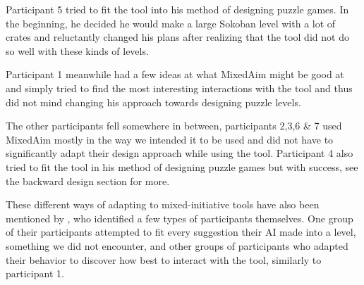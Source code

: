 Participant 5 tried to fit the tool into his method of designing puzzle games. In the beginning, he decided he would make a large Sokoban level with a lot of crates and reluctantly changed his plans after realizing that the tool did not do so well with these kinds of levels.

Participant 1 meanwhile had a few ideas at what MixedAim might be good at and simply tried to find the most interesting interactions with the tool and thus did not mind changing his approach towards designing puzzle levels.

The other participants fell somewhere in between, participants 2,3,6 \& 7 used MixedAim mostly in the way we intended it to be used and did not have to significantly adapt their design approach while using the tool. Participant 4 also tried to fit the tool in his method of designing puzzle games but with success, see the backward design section for more.

These different ways of adapting to mixed-initiative tools have also been mentioned by \cite{Guzdial}, who identified a few types of participants themselves.
One group of their participants attempted to fit every suggestion their AI made into a level, something we did not encounter, and other groups of participants who adapted their behavior to discover how best to interact with the tool, similarly to participant 1.

